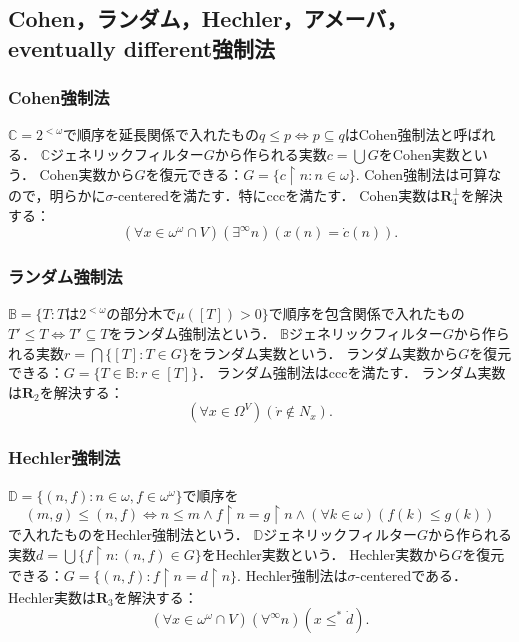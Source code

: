 \documentclass[uplatex,dvipdfmx]{jsarticle}
\newcommand{\B}{\mathbb{B}}
\newcommand{\C}{\mathbb{C}}
\newcommand{\relR}{\mathbf{R}}
\renewcommand\subset{\subseteq}
\theoremstyle{definition}
\begin{document}
	\subsection{Cohen，ランダム，Hechler，アメーバ，eventually different強制法}
	
		\subsubsection{Cohen強制法}
		
		$\C = 2^{<\omega}$で順序を延長関係で入れたもの$q \le p \iff p \subset q$はCohen強制法と呼ばれる．
		$\C$ジェネリックフィルター$G$から作られる実数$c = \bigcup G$をCohen実数という．
		Cohen実数から$G$を復元できる：$G = \{ c \upharpoonright n : n \in \omega \}$.
		Cohen強制法は可算なので，明らかに$\sigma$-centeredを満たす．特にcccを満たす．
		Cohen実数は$\relR_4^\perp$を解決する：
		\[
		(\forall x \in \omega^\omega \cap V)(\exists^\infty n)(x(n) = \dot{c}(n)).
		\]
		
		\subsubsection{ランダム強制法}
		
		$\B = \{ T : T\text{は}2^{<\omega}\text{の部分木で}\mu([T]) > 0 \}$で順序を包含関係で入れたもの$T' \le T \iff T' \subset T$をランダム強制法という．
		$\B$ジェネリックフィルター$G$から作られる実数$r = \bigcap \{[T] : T \in G \}$をランダム実数という．
		ランダム実数から$G$を復元できる：$G = \{ T \in \B : r \in [T] \}$．
		ランダム強制法はcccを満たす．
		ランダム実数は$\relR_2$を解決する：
		\[
		(\forall x \in \Omega^V)(\dot{r} \not \in N_x).
		\]
		
		\subsubsection{Hechler強制法}
		
		$\mathbb{D} = \{ (n, f) : n \in \omega, f \in \omega^\omega \}$で順序を
		\[(m, g) \le (n, f) \iff n \le m \land f \upharpoonright n = g \upharpoonright n \land (\forall k \in \omega)(f(k) \le g(k))\]
		で入れたものをHechler強制法という．
		$\mathbb{D}$ジェネリックフィルター$G$から作られる実数$d = \bigcup \{ f \upharpoonright n : (n, f) \in G \}$をHechler実数という．
		Hechler実数から$G$を復元できる：$G = \{ (n, f) : f \upharpoonright n = d \upharpoonright n \}$.
		Hechler強制法は$\sigma$-centeredである．
		Hechler実数は$\relR_3$を解決する：
		\[
		(\forall x \in \omega^\omega \cap V)(\forall^\infty n)(x \le^* \dot{d}).
		\]
		
\end{document}
